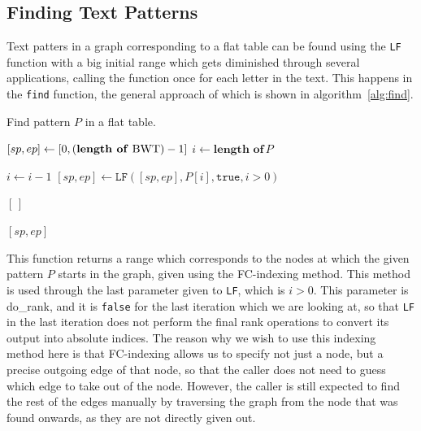 \documentclass[a4paper,12pt,twoside,BCOR=10mm]{scrbook}
\begin{document}
\subsection{Finding Text Patterns}

Text patters in a graph corresponding to a flat table
can be found using the \texttt{LF} function with a big initial range which gets diminished through
several applications, calling the function once for each letter in the text.
This happens in the \texttt{find} function, the general approach of which is shown in algorithm~\ref{alg:find}.
\begin{algorithm}
\caption[Find pattern in a flat table]{Find pattern $ P $ in a flat table.}
\label{alg:find}
\begin{algorithmic}[1]

\State $ [ sp, ep ] \gets [ 0, ( \textrm{\textbf{length of} BWT} ) - 1 ] $
\State $ i \gets \textbf{length of} \, P $

\State \phantom{nl}

	\State $ i \gets i - 1 $
	\State $ [ sp, ep ] \gets \texttt{LF} ( [ sp, ep ] , P [ i ] , \texttt{true} , i > 0 ) $

	\State \phantom{nl}

		\State \Return $ [ \, ] $
	\EndIf
\EndWhile

\State \phantom{nl}

\State \Return $ [ sp, ep ] $

\end{algorithmic}
\end{algorithm}
This function returns a range which corresponds to the nodes
at which the given pattern $ P $ starts in the graph,
given using the FC-indexing method.
This method is used through the last parameter given to \texttt{LF}, which is $ i > 0 $.
This parameter is do\_rank, and it is \texttt{false} for the last iteration which we
are looking at, so that \texttt{LF} in the last iteration does not perform the final rank operations
to convert its output into absolute indices.
The reason why we wish to use this indexing method here
is that FC-indexing allows us to specify not just a node,
but a precise outgoing edge of that node, so that the caller does
not need to guess which edge to take out of the node.
However, the caller is still expected to find the rest of the edges manually by
traversing the graph from the node that was found onwards,
as they are not directly given out.
\end{document}
